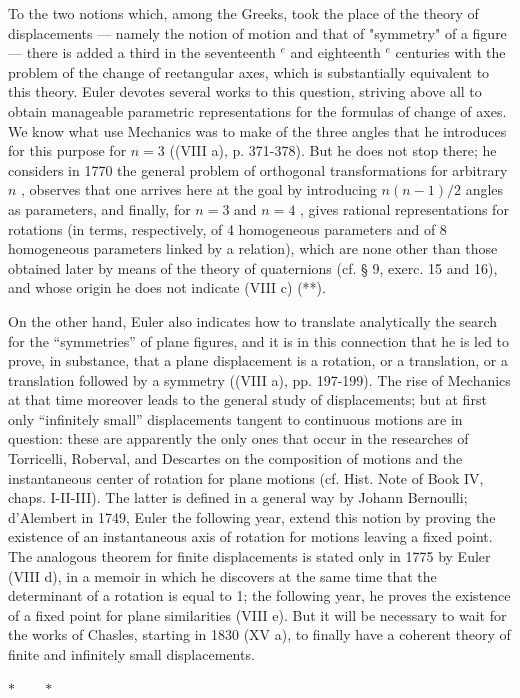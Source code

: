 To the two notions which, among the Greeks, took the place of the theory of displacements --- namely the notion of motion and that of "symmetry" of a figure --- there is added a third in the seventeenth \(^{e}\) and eighteenth \(^{e}\) centuries with the problem of the change of rectangular axes, which is substantially equivalent to this theory. Euler devotes several works to this question, striving above all to obtain manageable parametric representations for the formulas of change of axes. We know what use Mechanics was to make of the three angles that he introduces for this purpose for \(n = 3\) ((VIII a), p. 371-378). But he does not stop there; he considers in 1770 the general problem of orthogonal transformations for arbitrary \(n\) , observes that one arrives here at the goal by introducing \(n(n - 1)/2\) angles as parameters, and finally, for \(n = 3\) and \(n = 4\) , gives rational representations for rotations (in terms, respectively, of 4 homogeneous parameters and of 8 homogeneous parameters linked by a relation), which are none other than those obtained later by means of the theory of quaternions (cf. § 9, exerc. 15 and 16), and whose origin he does not indicate (VIII c) (**).

On the other hand, Euler also indicates how to translate analytically the search for the “symmetries” of plane figures, and it is in this connection that he is led to prove, in substance, that a plane displacement is a rotation, or a translation, or a translation followed by a symmetry ((VIII a), pp. 197-199). The rise of Mechanics at that time moreover leads to the general study of displacements; but at first only “infinitely small” displacements tangent to continuous motions are in question: these are apparently the only ones that occur in the researches of Torricelli, Roberval, and Descartes on the composition of motions and the instantaneous center of rotation for plane motions (cf. Hist. Note of Book IV, chaps. I-II-III). The latter is defined in a general way by Johann Bernoulli; d'Alembert in 1749, Euler the following year, extend this notion by proving the existence of an instantaneous axis of rotation for motions leaving a fixed point. The analogous theorem for finite displacements is stated only in 1775 by Euler (VIII d), in a memoir in which he discovers at the same time that the determinant of a rotation is equal to 1; the following year, he proves the existence of a fixed point for plane similarities (VIII e). But it will be necessary to wait for the works of Chasles, starting in 1830 (XV a), to finally have a coherent theory of finite and infinitely small displacements.
\relax{}
\begin{center}
\(\ast\qquad\ast\)
\end{center}

